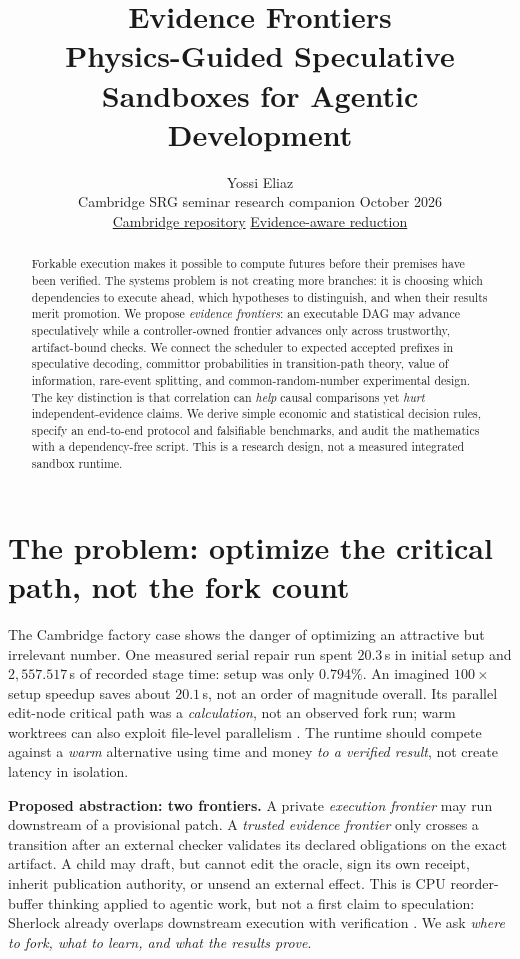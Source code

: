 \documentclass[10pt,twocolumn]{article}
\title{\vspace{-1.4em}\textcolor{ink}{\bfseries Evidence Frontiers}\\[-.5ex]
\large Physics-Guided Speculative Sandboxes for Agentic Development}
\author{Yossi Eliaz\\[-2pt]\small Cambridge SRG seminar research companion \;\textbar\; 13 October 2026\\[-3pt]
\small\href{https://github.com/zozo123/cam-talk-london-26}{Cambridge repository}\;\textbar\;
\href{https://arxiv.org/abs/2607.09689}{Evidence-aware reduction}}
\date{}
\newcommand{\claim}[1]{\textbf{\color{accent}#1}}
\begin{document}
\maketitle\vspace{-1.1em}
\begin{abstract}\noindent
Forkable execution makes it possible to compute futures before their premises have been verified. The systems problem is not creating more branches: it is choosing which dependencies to execute ahead, which hypotheses to distinguish, and when their results merit promotion. We propose \emph{evidence frontiers}: an executable DAG may advance speculatively while a controller-owned frontier advances only across trustworthy, artifact-bound checks. We connect the scheduler to expected accepted prefixes in speculative decoding, committor probabilities in transition-path theory, value of information, rare-event splitting, and common-random-number experimental design. The key distinction is that correlation can \emph{help} causal comparisons yet \emph{hurt} independent-evidence claims. We derive simple economic and statistical decision rules, specify an end-to-end protocol and falsifiable benchmarks, and audit the mathematics with a dependency-free script. This is a research design, not a measured integrated sandbox runtime.
\end{abstract}
\vspace{-0.5em}

\section{The problem: optimize the critical path, not the fork count}

The Cambridge factory case shows the danger of optimizing an attractive but irrelevant number. One measured serial repair run spent $20.3$\,s in initial setup and $2{,}557.517$\,s of recorded stage time: setup was only $0.794\%$. An imagined $100\times$ setup speedup saves about $20.1$\,s, not an order of magnitude overall. Its parallel edit-node critical path was a \emph{calculation}, not an observed fork run; warm worktrees can also exploit file-level parallelism \cite{cam}. The runtime should compete against a \emph{warm} alternative using time and money \emph{to a verified result}, not create latency in isolation.

\claim{Proposed abstraction: two frontiers.} A private \emph{execution frontier} may run downstream of a provisional patch. A \emph{trusted evidence frontier} only crosses a transition after an external checker validates its declared obligations on the exact artifact. A child may draft, but cannot edit the oracle, sign its own receipt, inherit publication authority, or unsend an external effect. This is CPU reorder-buffer thinking applied to agentic work, but not a first claim to speculation: Sherlock already overlaps downstream execution with verification \cite{sherlock}. We ask \emph{where to fork, what to learn, and what the results prove}.
\end{document}
